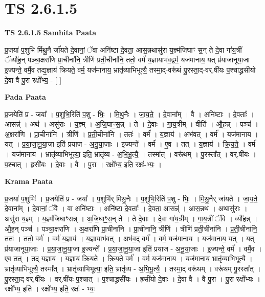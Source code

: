 \documentclass[17pt]{extarticle}
\begin{document}
\section*{ TS 2.6.1.5 }

\textbf{TS 2.6.1.5 } \newline
\textbf{Samhita Paata} \newline

प्र॒जया॑ प॒शुभि॑ र्मिथु॒नै र्जा॑यते दे॒वानां॒ ॅवा अनि॑ष्टा दे॒वता॒ आस॒न्नथासु॑रा य॒ज्ञ्म॑जिघाꣳ स॒न् ते दे॒वा गा॑य॒त्रीं ॅव्यौ॑ह॒न् पञ्चा॒क्षरा॑णि प्रा॒चीना॑नि॒ त्रीणि॑ प्रती॒चीना॑नि॒ ततो॒ वर्म॑ य॒ज्ञायाभ॑व॒द्वर्म॒ यज॑मानाय॒ यत् प्र॑याजानूया॒जा इ॒ज्यन्ते॒ वर्मै॒व तद्य॒ज्ञाय॑ क्रियते॒ वर्म॒ यज॑मानाय॒ भ्रातृ॑व्याभिभूत्यै॒ तस्मा॒द्-वरू॑थं पु॒रस्ता॒द्-वर्.षी॑यः प॒श्चाद्ध्रसी॑यो दे॒वा वै पु॒रा रक्षो᳚भ्य॒ - [  ] \newline

\textbf{Pada Paata} \newline

प्र॒जयेति॑ प्र - जया᳚ । प॒शुभि॒रिति॑ प॒शु - भिः॒ । मि॒थु॒नैः । जा॒य॒ते॒ । दे॒वाना᳚म् । वै । अनि॑ष्टाः । दे॒वताः᳚ । आसन्न्॑ । अथ॑ । असु॑राः । य॒ज्ञ्म् । अ॒जि॒घाꣳ॒॒स॒न्न् । ते । दे॒वाः । गा॒य॒त्रीम् । वीति॑ । औ॒ह॒न्न् । पञ्च॑ । अ॒क्षरा॑णि । प्रा॒चीना॑नि । त्रीणि॑ । प्र॒ती॒चीना॑नि । ततः॑ । वर्म॑ । य॒ज्ञाय॑ । अभ॑वत् । वर्म॑ । यज॑मानाय । यत् । प्र॒या॒जा॒नू॒या॒जा इति॑ प्रयाज - अ॒नू॒या॒जाः । इ॒ज्यन्ते᳚ । वर्म॑ । ए॒व । तत् । य॒ज्ञाय॑ । क्रि॒य॒ते॒ । वर्म॑ । यज॑मानाय । भ्रातृ॑व्याभिभूत्या॒ इति॒ भ्रातृ॑व्य - अ॒भि॒भू॒त्यै॒ । तस्मा᳚त् । वरू॑थम् । पु॒रस्ता᳚त् । वर्.षी॑यः । प॒श्चात् । ह्रसी॑यः । दे॒वाः । वै । पु॒रा । रक्षो᳚भ्य॒ इति॒ रक्षः॑-भ्यः॒ ।  \newline


\textbf{Krama Paata} \newline

प्र॒जया॑ प॒शुभिः॑ । प्र॒जयेति॑ प्र - जया᳚ । प॒शुभि॑र् मिथु॒नैः । प॒शुभि॒रिति॑ प॒शु - भिः॒ । मि॒थु॒नैर् जा॑यते । जा॒य॒ते॒ दे॒वाना᳚म् । दे॒वानां॒ ॅवै । वा अनि॑ष्टाः । अनि॑ष्टा दे॒वताः᳚ । दे॒वता॒ आसन्न्॑ । आस॒न्नथ॑ । अथासु॑राः । असु॑रा य॒ज्ञ्म् । य॒ज्ञ्म॑जिघाꣳसन्न् । अ॒जि॒घाꣳ॒॒स॒न् ते । ते दे॒वाः । दे॒वा गा॑य॒त्रीम् । गा॒य॒त्रीं ॅवि । व्यौ॑हन्न् । औ॒ह॒न् पञ्च॑ । पञ्चा॒क्षरा॑णि । अ॒क्षरा॑णि प्रा॒चीना॑नि । प्रा॒चीना॑नि॒ त्रीणि॑ । त्रीणि॑ प्रती॒चीना॑नि । प्र॒ती॒चीना॑नि॒ ततः॑ । ततो॒ वर्म॑ । वर्म॑ य॒ज्ञाय॑ । य॒ज्ञायाभ॑वत् । अभ॑व॒द् वर्म॑ । वर्म॒ यज॑मानाय । यज॑मानाय॒ यत् । यत् प्र॑याजानूया॒जाः । प्र॒या॒जा॒नू॒या॒जा इ॒ज्यन्ते᳚ । प्र॒या॒जा॒नू॒या॒जा इति॑ प्रयाज - अ॒नू॒या॒जाः । इ॒ज्यन्ते॒ वर्म॑ । वर्मै॒व । ए॒व तत् । तद् य॒ज्ञाय॑ । य॒ज्ञाय॑ क्रियते । क्रि॒य॒ते॒ वर्म॑ । वर्म॒ यज॑मानाय । यज॑मानाय॒ भ्रातृ॑व्याभिभूत्यै । भ्रातृ॑व्याभिभूत्यै॒ तस्मा᳚त् । भ्रातृ॑व्याभिभूत्या॒ इति॒ भ्रातृ॑व्य - अ॒भि॒भू॒त्यै॒ । तस्मा॒द् वरू॑थम् । वरू॑थम् पु॒रस्ता᳚त् । पु॒रस्ता॒द् वर्.षी॑यः । वर्.षी॑यः प॒श्चात् । प॒श्चाद्ध्रसी॑यः । ह्रसी॑यो दे॒वाः । दे॒वा वै । वै पु॒रा । पु॒रा रक्षो᳚भ्यः । रक्षो᳚भ्य॒ इति॑ । रक्षो᳚भ्य॒ इति॒ रक्षः॑ - भ्यः॒ \newline
\end{document}
